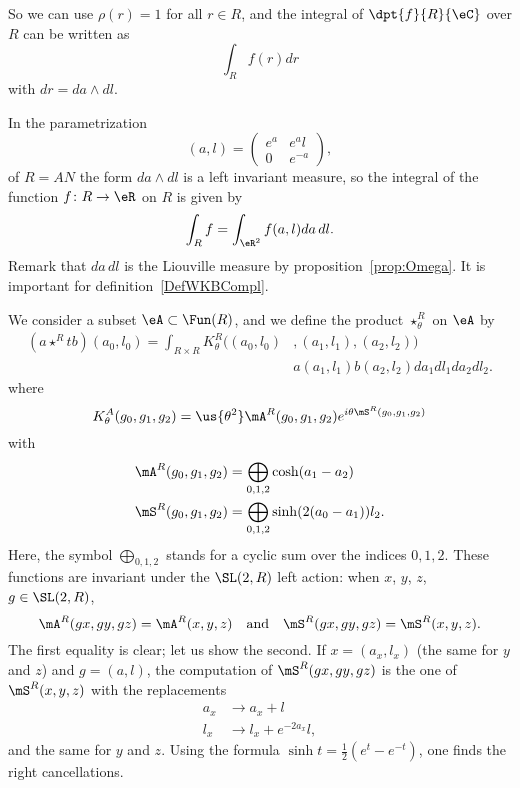 So we can use $\rho(r)=1$ for all $r\in R$, and the integral of $\dpt{f}{R}{\eC}$ over $R$ can be written as
\[
\int_Rf(r)dr
\]
with $dr=da\wedge dl$.

In the parametrization
\[
  (a,l)=\begin{pmatrix}
 e^{a}      &  e^{a}l\\
0       &    e^{-a}
\end{pmatrix},
\]
of $R=AN$ the form $da\wedge dl$ is a left invariant measure, so the integral of the function $f\colon R\to \eR$ on $R$ is given by
\[
  \int_R f=\int_{\eR^2} f(a,l)da\,dl.
\]
Remark that $da\,dl$ is the Liouville measure by proposition~\ref{prop:Omega}. It is important for definition~\ref{DefWKBCompl}.

We consider a subset $\eA\subset\Fun(R)$, and we define the product $\star^{R}_{\theta}$ on $\eA$ by
\begin{equation}\label{eq:star_R}
\begin{split}
(a\star^{R}t b)(a_0,l_0)
=\int_{R\times R}K^R_{\theta}\big((a_0,l_0)&,(a_1,l_1),(a_2,l_2)\big)\\
                                           &a(a_1,l_1)b(a_2,l_2)da_1dl_1da_2dl_2.
\end{split}
\end{equation}
where
\[
K_{\theta}^A(g_0,g_1,g_2)=\us{\theta^2}\mA^R(g_0,g_1,g_2)e^{i\theta \mS^R(g_0,g_1,g_2)}
\]
 with
\begin{subequations}
\begin{align}
  \mA^R(g_0,g_1,g_2)&=\bigoplus_{0,1,2}\cosh(a_1-a_2)\\
  \mS^R(g_0,g_1,g_2)&=\bigoplus_{0,1,2}\sinh(2(a_0-a_1))l_2.
\end{align}
\end{subequations}
Here, the symbol $\bigoplus_{0,1,2}$ stands for a cyclic sum over the indices $0,1,2$.
These functions are invariant under the $\SL(2,R)$ left action: when $x$, $y$, $z$, $g\in\SL(2,R)$,
\begin{equation}
 \mA^R(gx,gy,gz)=\mA^R(x,y,z)\quad\text{and}\quad \mS^R(gx,gy,gz)=\mS^R(x,y,z).
\end{equation}
 The first equality is clear; let us show the second. If $x=(a_x,l_x)$ (the same for $y$ and $z$) and $g=(a,l)$, the computation of $\mS^R(gx,gy,gz)$ is the one of $\mS^R(x,y,z)$ with the replacements
\begin{subequations}
\begin{align}
a_x&\rightarrow a_x+l\\
l_x&\rightarrow l_x+e^{-2a_x}l,
\end{align}
\end{subequations}
and the same for $y$ and $z$. Using the formula $\sinh t=\frac{1}{2}(e^{t}-e^{-t})$, one finds the right cancellations.

